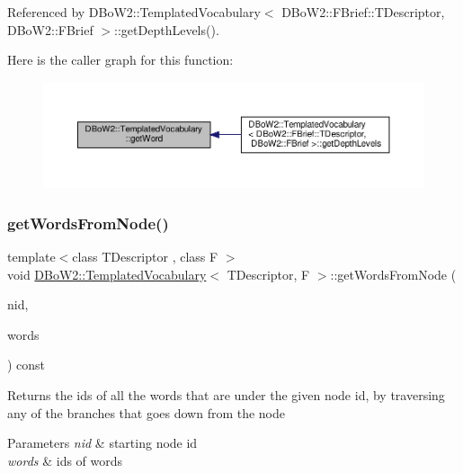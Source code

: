 Referenced by D\+Bo\+W2\+::\+Templated\+Vocabulary$<$ D\+Bo\+W2\+::\+F\+Brief\+::\+T\+Descriptor, D\+Bo\+W2\+::\+F\+Brief $>$\+::get\+Depth\+Levels().

Here is the caller graph for this function\+:\nopagebreak
\begin{figure}[H]
\begin{center}
\leavevmode
\includegraphics[width=350pt]{classDBoW2_1_1TemplatedVocabulary_a3f0d8b15b4f673bf9888ff23489430b4_icgraph}
\end{center}
\end{figure}
\mbox{\label{classDBoW2_1_1TemplatedVocabulary_a809f881020a2b953664b1f528828551e}} 
\subsubsection{\texorpdfstring{get\+Words\+From\+Node()}{getWordsFromNode()}}
{\footnotesize\ttfamily template$<$class T\+Descriptor , class F $>$ \\
void \hyperlink{classDBoW2_1_1TemplatedVocabulary}{D\+Bo\+W2\+::\+Templated\+Vocabulary}$<$ T\+Descriptor, F $>$\+::get\+Words\+From\+Node (\begin{DoxyParamCaption}\item[{\hyperlink{namespaceDBoW2_a3a0fa9c50c0df508759362d6204566f2}{Node\+Id}}]{nid,  }\item[{std\+::vector$<$ \hyperlink{namespaceDBoW2_ab1a0d3283b2d4690a383372ed20bfeb5}{Word\+Id} $>$ \&}]{words }\end{DoxyParamCaption}) const}

Returns the ids of all the words that are under the given node id, by traversing any of the branches that goes down from the node 
\begin{DoxyParams}{Parameters}
{\em nid} & starting node id \\
\hline
{\em words} & ids of words \\
\hline
\end{DoxyParams}
\mbox{\label{classDBoW2_1_1TemplatedVocabulary_ace5645b42739bea1e3da05c6cff60bad}} 
